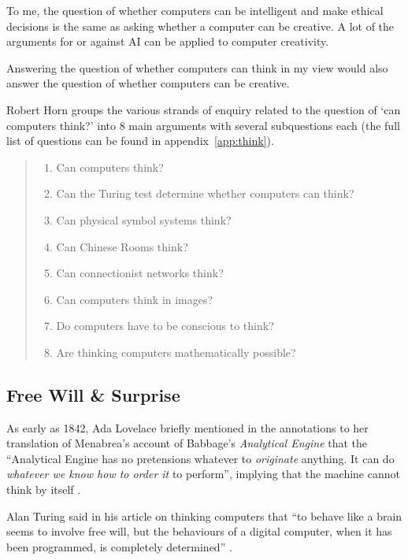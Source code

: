 To me, the question of whether computers can be intelligent and make ethical decisions is the same as asking whether a computer can be creative. A lot of the arguments for or against \ac{AI} can be applied to computer creativity.  

Answering the question of whether computers can think in my view would also answer the question of whether computers can be creative.
 
Robert Horn groups the various strands of enquiry related to the question of `can computers think?' into 8 main arguments with several subquestions each \citeyear{Horn2009} (the full list of questions can be found in appendix~\ref{app:think}). 

\begin{quotation}
  \begin{enumerate}
    \item Can computers think?
    \item Can the Turing test determine whether computers can think?
    \item Can physical symbol systems think?
    \item Can Chinese Rooms think?
    \item Can connectionist networks think?
    \item Can computers think in images?
    \item Do computers have to be conscious to think?
    \item Are thinking computers mathematically possible?
  \end{enumerate}
\end{quotation}


\subsection{Free Will \& Surprise}

As early as 1842, Ada Lovelace briefly mentioned in the annotations to her translation of Menabrea's account of Babbage's \textit{Analytical Engine} that the ``Analytical Engine has no pretensions whatever to \textit{originate} anything. It can do \textit{whatever we know how to order it} to perform'', implying that the machine cannot think by itself \autocite{Menabrea1842}.

Alan Turing said in his article on thinking computers that ``to behave like a brain seems to involve free will, but the behaviours of a digital computer, when it has been programmed, is completely determined'' \citeyear{Turing1951}. 

